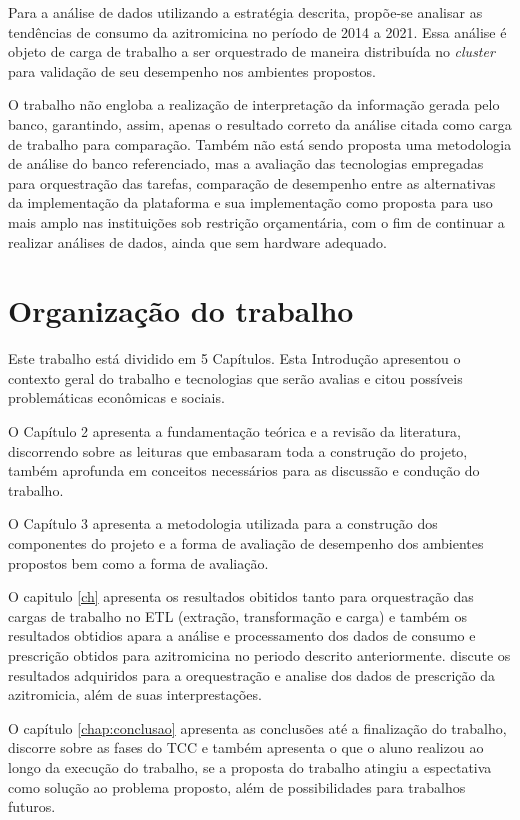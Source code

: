 Para a análise de dados utilizando a estratégia descrita, propõe-se analisar as tendências de consumo da azitromicina no período de 2014 a 2021. Essa análise é objeto de carga de trabalho a ser orquestrado de maneira distribuída no \emph{cluster} para validação de seu desempenho nos ambientes propostos.

O trabalho não engloba a realização de interpretação da informação gerada pelo banco, garantindo, assim, apenas o resultado correto da análise citada como carga de trabalho para comparação. Também não está sendo proposta uma metodologia de análise do banco referenciado, mas a avaliação das tecnologias empregadas para orquestração das tarefas, comparação de desempenho entre as alternativas da implementação da plataforma e sua implementação como proposta para uso mais amplo nas instituições sob restrição orçamentária, com o fim de continuar a realizar análises de dados, ainda que sem hardware adequado.


\section{Organização do trabalho}
\label{sec:organizacaoTrabalho}

Este trabalho está dividido em 5 Capítulos. Esta Introdução apresentou o contexto geral do trabalho e tecnologias que serão avalias e citou possíveis problemáticas econômicas e sociais. 

O Capítulo 2 apresenta a fundamentação teórica e a revisão da literatura, discorrendo sobre as leituras que embasaram toda a construção do projeto, também aprofunda em conceitos necessários para as discussão e condução do trabalho. 

O Capítulo 3 apresenta a  metodologia utilizada para a construção dos componentes do projeto e a forma de avaliação de desempenho dos ambientes propostos bem como a forma de avaliação. 

O capitulo \ref{ch} apresenta os resultados obitidos tanto para orquestração das cargas de trabalho no ETL (extração, transformação e carga) e também os resultados obtidios apara a análise e processamento dos dados de consumo e prescrição obtidos para azitromicina no periodo descrito anteriormente.
discute os resultados adquiridos para a orequestração e analise dos dados de prescrição da azitromicia, além de suas interprestações. 

O capítulo \ref{chap:conclusao} apresenta as conclusões até a finalização do trabalho, discorre sobre as fases do TCC e também apresenta o que o aluno realizou ao longo da execução do trabalho, se a proposta do trabalho atingiu a espectativa como solução ao problema  proposto, além de possibilidades para trabalhos futuros. 